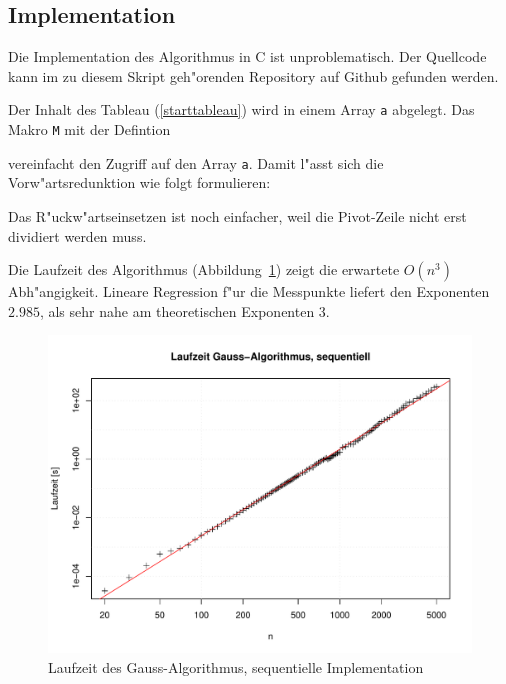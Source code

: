 \subsection{Implementation}
Die Implementation des Algorithmus in C ist unproblematisch. Der Quellcode
kann im zu diesem Skript geh"orenden Repository auf Github gefunden
werden. 

Der Inhalt des Tableau (\ref{starttableau}) wird in einem Array {\tt a}
abgelegt. Das Makro {\tt M} mit der Defintion

vereinfacht den Zugriff auf den Array {\tt a}. Damit l"asst sich die 
Vorw"artsredunktion wie folgt formulieren:

Das R"uckw"artseinsetzen ist noch einfacher, weil die Pivot-Zeile
nicht erst dividiert werden muss.

Die Laufzeit des Algorithmus (Abbildung~\ref{laufzeit-sequentiell})
zeigt die erwartete $O(n^3)$ Abh"angigkeit. Lineare Regression f"ur 
die Messpunkte liefert den Exponenten $2.985$, als sehr nahe am
theoretischen Exponenten 3.
\begin{figure}
\begin{center}
\includegraphics[width=\hsize]{images/gauss-seq.pdf}
\end{center}
\caption{Laufzeit des Gauss-Algorithmus, sequentielle Implementation
\label{laufzeit-sequentiell}}
\end{figure}

